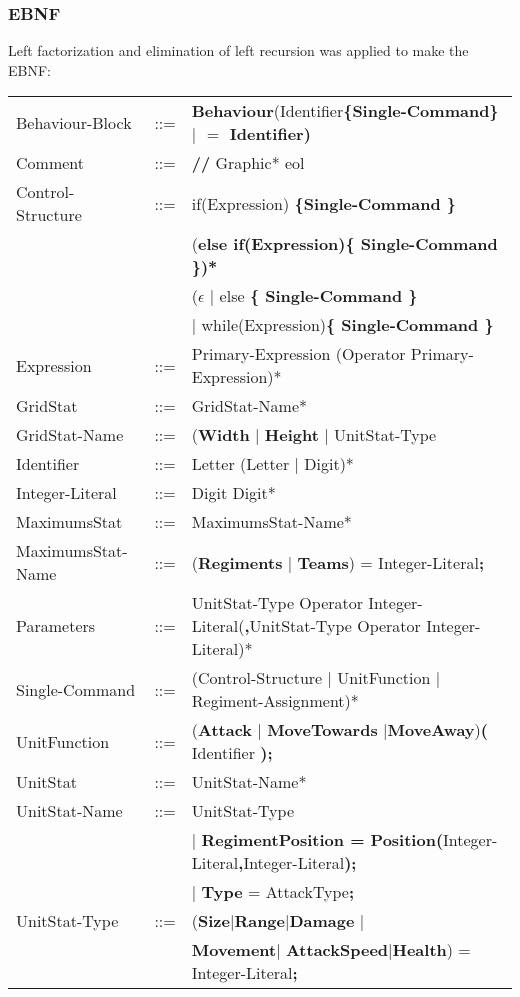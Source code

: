 	\subsubsection{EBNF}
		Left factorization and elimination of left recursion was applied to make the EBNF: \\
		\begin{center}
			\begin{tabular}{ l l p{11cm} }
	Behaviour-Block	   &	::=	 & {\bf Behaviour}(Identifier\bf{\{}Single-Command\bf{\}} $\mid$ {\bf $=$} Identifier)\\
	Comment			   &    ::=  & {\bf //} Graphic* eol\\
	Control-Structure  &  	::=  & if(Expression) \bf{\{}Single-Command \bf{\}}\\
					   &  	     & (\bf{else if(}Expression\bf{)\{ }Single-Command\bf{ \}})* \\
					   &		 & ($\epsilon$ $\mid$ else \bf{\{ }Single-Command \bf{\} }\\					   
					   &   		 & $\mid$ while(Expression)\bf{\{ } Single-Command \bf{\}}\\
	Expression 		   &	::=	 & Primary-Expression (Operator Primary-Expression)*\\	
	GridStat		   &	::=  & GridStat-Name*\\	
	GridStat-Name	   &	::=  & ({\bf Width} $\mid$ {\bf Height} $\mid$ UnitStat-Type\\	
	Identifier 		   &    ::=  & Letter (Letter $\mid$ Digit)*\\
	Integer-Literal    &	::=  & Digit Digit*\\
	MaximumsStat	   &	::=  & MaximumsStat-Name*\\
	MaximumsStat-Name  &	::=  & ({\bf Regiments }$\mid$ {\bf Teams}) =  Integer-Literal{\bf ;}\\		 
	Parameters		   &	::=	 & UnitStat-Type Operator Integer-Literal({\bf ,}UnitStat-Type Operator Integer-Literal)*\\
	Single-Command     &	::=  & (Control-Structure $\mid$ UnitFunction $\mid$ Regiment-Assignment)*\\		
	UnitFunction	   &	::=	 & ({\bf Attack} $\mid$ {\bf MoveTowards} $\mid${\bf MoveAway}){\bf (} Identifier {\bf );}\\
	UnitStat		   &	::=  & UnitStat-Name*\\
	UnitStat-Name	   &	::=	 & UnitStat-Type\\ 
					   &	     & $\mid$ {\bf RegimentPosition = Position(}Integer-Literal{\bf ,}Integer-Literal{\bf );}\\
					   &		 & $\mid$ {\bf Type} = AttackType{\bf ;}\\
	UnitStat-Type	   &	::=  & ({\bf Size}$\mid${\bf Range}$\mid${\bf Damage} $\mid$\\
					   &	     & {\bf Movement}$\mid$ {\bf AttackSpeed}$\mid${\bf Health}) = Integer-Literal{\bf ;}\\ 



			
			\end{tabular}
		\end{center}					     